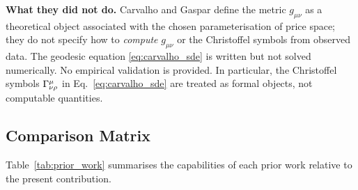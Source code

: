 \textbf{What they did not do.}  Carvalho and Gaspar define the metric $g_{\mu\nu}$
as a theoretical object associated with the chosen parameterisation of price
space; they do not specify how to \emph{compute} $g_{\mu\nu}$ or the Christoffel
symbols from observed \ohlcv{} data.  The geodesic equation
\eqref{eq:carvalho_sde} is written but not solved numerically.  No empirical
validation is provided.  In particular, the Christoffel symbols $\Gamma^{\mu}_{\nu \rho}$
in Eq.~\eqref{eq:carvalho_sde} are treated as formal objects, not computable
quantities.

\subsection{Comparison Matrix}

Table~\ref{tab:prior_work} summarises the capabilities of each prior work
relative to the present contribution.

